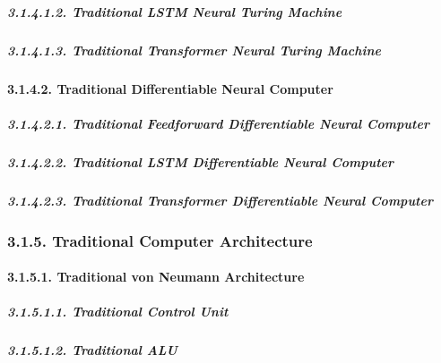 \documentclass[
]{article}
\begin{document}
\hypertarget{traditional-lstm-neural-turing-machine-1}{%
\subparagraph{3.1.4.1.2. Traditional LSTM Neural Turing
Machine}\label{traditional-lstm-neural-turing-machine-1}}

\hypertarget{traditional-transformer-neural-turing-machine-1}{%
\subparagraph{3.1.4.1.3. Traditional Transformer Neural Turing
Machine}\label{traditional-transformer-neural-turing-machine-1}}

\hypertarget{traditional-differentiable-neural-computer-1}{%
\paragraph{3.1.4.2. Traditional Differentiable Neural
Computer}\label{traditional-differentiable-neural-computer-1}}

\hypertarget{traditional-feedforward-differentiable-neural-computer-1}{%
\subparagraph{3.1.4.2.1. Traditional Feedforward Differentiable Neural
Computer}\label{traditional-feedforward-differentiable-neural-computer-1}}

\hypertarget{traditional-lstm-differentiable-neural-computer-1}{%
\subparagraph{3.1.4.2.2. Traditional LSTM Differentiable Neural
Computer}\label{traditional-lstm-differentiable-neural-computer-1}}

\hypertarget{traditional-transformer-differentiable-neural-computer-1}{%
\subparagraph{3.1.4.2.3. Traditional Transformer Differentiable Neural
Computer}\label{traditional-transformer-differentiable-neural-computer-1}}

\hypertarget{traditional-computer-architecture-1}{%
\subsubsection{3.1.5. Traditional Computer
Architecture}\label{traditional-computer-architecture-1}}

\hypertarget{traditional-von-neumann-architecture-1}{%
\paragraph{3.1.5.1. Traditional von Neumann
Architecture}\label{traditional-von-neumann-architecture-1}}

\hypertarget{traditional-control-unit-2}{%
\subparagraph{3.1.5.1.1. Traditional Control
Unit}\label{traditional-control-unit-2}}

\hypertarget{traditional-alu-2}{%
\subparagraph{3.1.5.1.2. Traditional ALU}\label{traditional-alu-2}}
\end{document}
